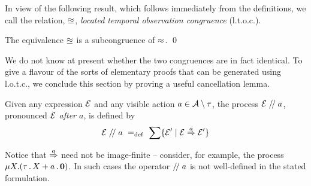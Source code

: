 \documentclass[orivec,envcountsame]{llncs}
\begin{document}
In view of the following result, which follows immediately from the
definitions, we call the relation, $\approxeq$, \emph{located temporal
observation congruence} (l.t.o.c.).

\begin{lemma}
The equivalence $\approxeq$ is a subcongruence of $\approx$. \qed
\end{lemma}

We do not know at present whether the two congruences are in fact
identical. To give a flavour of the sorts of elementary proofs that can
be generated using l.o.t.c., we conclude this section by proving a
useful cancellation lemma.

\begin{definition}
Given any expression $\text{$\mathcal{E}$}$ and any visible action $a \in
\text{$\mathcal{A}$}\setminus\tau$, the process $\text{$\mathcal{E}$}\mathrel{/\!/} a$, pronounced
\emph{$\text{$\mathcal{E}$}$ after $a$}, is defined by
\[
    \text{$\mathcal{E}$}\mathrel{/\!/} a \mathrel{~=_\mathrm{def}~} \sum \{ \text{$\mathcal{E}$}' \mid \text{$\mathcal{E}$} \stackrel{a}{\Rightarrow} \text{$\mathcal{E}$}' \}
\]
\end{definition}

Notice that $\stackrel{a}{\Rightarrow}$ need not be image-finite -- consider, for
example, the process $\mu X .(\tau\,.\, X + a\,.\,\textbf{0})$. In such cases
the operator $\mathrel{/\!/} a$ is not well-defined in the stated formulation.
\end{document}
